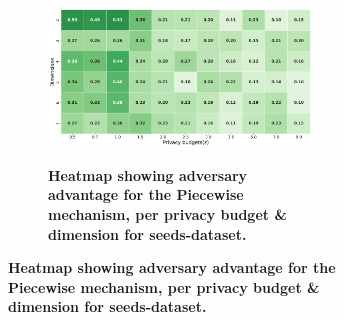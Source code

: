 \begin{figure}[H]
\begin{subfigure}[b]{0.9\textwidth}
            \begin{subfigure}[c]{1\textwidth}
                  \caption{\textbf{Heatmap showing adversary advantage for the Piecewise mechanism, per privacy budget \& dimension for seeds-dataset.}}
                  \includegraphics[width=1\textwidth]{Results/kd-laplace/piecewise/seeds-dataset/shokri_mi_adv.png}
                  \label{fig:privacy_seeds-dataset_adversial_advantage_piecewise}
            \end{subfigure}
      \end{subfigure}
      \hfill %
      \begin{subfigure}[b]{0.075\textwidth}

\end{subfigure}
\end{figure}
